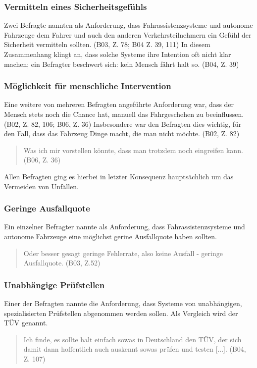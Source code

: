 \documentclass[12pt]{article}
\begin{document}
\subsubsection*{Vermitteln eines Sicherheitsgefühls}
Zwei Befragte nannten als Anforderung, dass Fahrassistenzsysteme und autonome Fahrzeuge dem Fahrer und auch den anderen Verkehrsteilnehmern ein Gefühl der Sicherheit vermitteln sollten. (B03, Z. 78; B04 Z. 39, 111) In diesem Zusammenhang klingt an, dass solche Systeme ihre Intention oft nicht klar machen; ein Befragter beschwert sich: \glqq kein Mensch fährt halt so\grqq{}. (B04, Z. 39)

\subsubsection*{Möglichkeit für menschliche Intervention}
Eine weitere von mehreren Befragten angeführte Anforderung war, dass der Mensch stets noch die Chance hat, manuell das Fahrgeschehen zu beeinflussen. (B02, Z. 82, 106; B06, Z. 36) Insbesondere war den Befragten dies wichtig, für den Fall, dass \glqq das Fahrzeug Dinge macht, die man nicht möchte\grqq{}. (B02, Z. 82)

\begin{quote}
    Was ich mir vorstellen könnte, dass man trotzdem noch eingreifen kann. (B06, Z. 36)
\end{quote}

Allen Befragten ging es hierbei in letzter Konsequenz hauptsächlich um das Vermeiden von Unfällen.

\subsubsection*{Geringe Ausfallquote}
Ein einzelner Befragter nannte als Anforderung, dass Fahrassistenzsysteme und autonome Fahrzeuge eine möglichst gerine Ausfallquote haben sollten.

\begin{quote}
    Oder besser gesagt geringe Fehlerrate, also keine Ausfall - geringe Ausfallquote. (B03, Z.52)
\end{quote}

\subsubsection*{Unabhängige Prüfstellen}
Einer der Befragten nannte die Anforderung, dass Systeme von unabhängigen, spezialisierten Prüfstellen abgenommen werden sollen. Als Vergleich wird der TÜV genannt.
\begin{quote}
    Ich finde, es sollte halt einfach sowas in Deutschland den TÜV, der sich damit dann hoffentlich auch auskennt sowas prüfen und testen [...]. (B04, Z. 107)
\end{quote}
\end{document}
